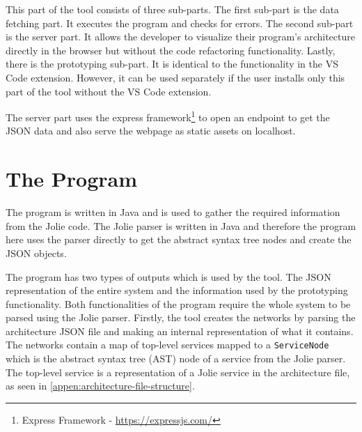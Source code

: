 This part of the tool consists of three sub-parts.
The first sub-part is the data fetching part. It executes the \javatoolname[] program and checks for errors. The second sub-part is the server part. It allows the developer to visualize their program's architecture directly in the browser but without the code refactoring functionality. 
Lastly, there is the prototyping sub-part. It is identical to the functionality in the VS Code extension. However, it can be used separately if the user installs only this part of the tool without the VS Code extension.

The server part uses the express framework\footnote{Express Framework - \url{https://expressjs.com/}} to open an endpoint to get the JSON data and also serve the webpage as static assets on localhost.


\section{The \javatoolname[] Program}
The \javatoolname[] program is written in Java and is used to gather the required information from the Jolie code. The Jolie parser is written in Java and therefore the \javatoolname[] program here uses the parser directly to get the abstract syntax tree nodes and create the JSON objects.

The \javatoolname[] program has two types of outputs which is used by the tool. The JSON representation of the entire system and the information used by the prototyping functionality. Both functionalities of the \javatoolname[] program require the whole system to be parsed using the Jolie parser.
Firstly, the tool creates the networks by parsing the architecture JSON file and making an internal representation of what it contains. The networks contain a map of top-level services mapped to a \texttt{ServiceNode} which is the abstract syntax tree (AST) node of a service from the Jolie parser. The top-level service is a representation of a Jolie service in the architecture file, as seen in \cref{appen:architecture-file-structure}.

